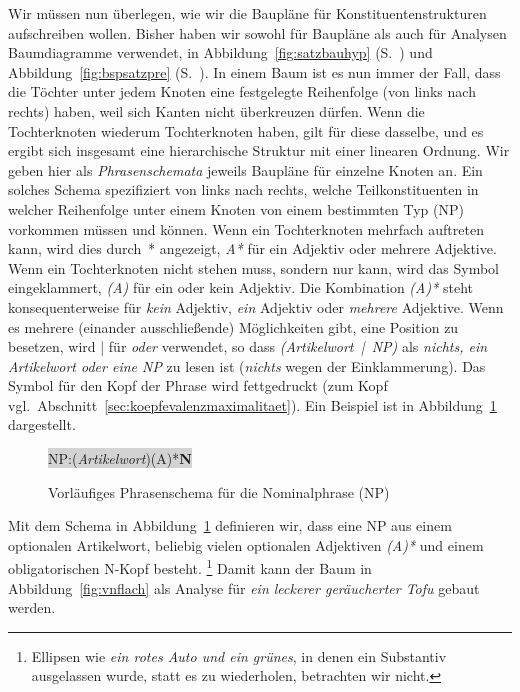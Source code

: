 Wir müssen nun überlegen, wie wir die Baupläne für Konstituentenstrukturen aufschreiben wollen.
Bisher haben wir sowohl für Baupläne als auch für Analysen Baumdiagramme verwendet, \zB in Abbildung~\ref{fig:satzbauhyp} (S.~\pageref{fig:satzbauhyp}) und Abbildung~\ref{fig:bspsatzpre} (S.~\pageref{fig:bspsatzpre}).
In einem Baum ist es nun immer der Fall, dass die Töchter unter jedem Knoten eine festgelegte Reihenfolge (von links nach rechts) haben, weil sich Kanten nicht überkreuzen dürfen.
Wenn die Tochterknoten wiederum Tochterknoten haben, gilt für diese dasselbe, und es ergibt sich insgesamt eine hierarchische Struktur mit einer linearen Ordnung.
Wir geben hier als \textit{Phrasenschemata} jeweils Baupläne für einzelne Knoten an.
Ein solches Schema spezifiziert von links nach rechts, welche Teilkonstituenten in welcher Reihenfolge unter einem Knoten von einem bestimmten Typ (\zB NP) vorkommen müssen und können.
Wenn ein Tochterknoten mehrfach auftreten kann, wird dies durch~* angezeigt, \zB \textit{A*} für ein Adjektiv oder mehrere Adjektive.
Wenn ein Tochterknoten nicht stehen muss, sondern nur kann, wird das Symbol eingeklammert, \zB \textit{(A)} für ein oder kein Adjektiv.
Die Kombination \textit{(A)*} steht konsequenterweise für \textit{kein} Adjektiv, \textit{ein} Adjektiv oder \textit{mehrere} Adjektive.
Wenn es mehrere (einander ausschließende) Möglichkeiten gibt, eine Position zu besetzen, wird | für \textit{oder} verwendet, so dass \textit{(Artikelwort~|~NP)} als \textit{nichts, ein Artikelwort oder eine NP} zu lesen ist (\textit{nichts} wegen der Einklammerung).
Das Symbol für den Kopf der Phrase wird fettgedruckt (zum Kopf vgl.\ Abschnitt~\ref{sec:koepfevalenzmaximalitaet}).
Ein Beispiel ist in Abbildung~\ref{fig:strschembsp} dargestellt.

\begin{figure}[!htbp]
  \centering
  \colorbox{lightgray}{\strschemspace NP\strschemspace:\strschemspace(\textit{Artikelwort})\strschemspace(A)*\strschemspace\textbf{N}\strschemspace}
  \caption{Vorläufiges Phrasenschema für die Nominalphrase (NP)}
  \label{fig:strschembsp}
\end{figure}

Mit dem Schema in Abbildung~\ref{fig:strschembsp} definieren wir, dass eine NP aus einem optionalen Artikelwort, beliebig vielen optionalen Adjektiven \textit{(A)*} und einem obligatorischen N-Kopf besteht.%
\footnote{Ellipsen wie \zB \textit{ein rotes Auto und ein grünes}, in denen ein Substantiv ausgelassen wurde, statt es zu wiederholen, betrachten wir nicht.}
Damit kann der Baum in Abbildung~\ref{fig:vnflach} als Analyse für \textit{ein leckerer geräucherter Tofu} gebaut werden.

